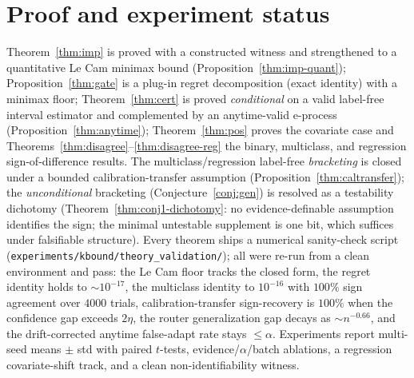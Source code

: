 \documentclass[conference]{IEEEtran}
\theoremstyle{plain}
\theoremstyle{definition}
\begin{document}
\section{Proof and experiment status}\label{app:status}
Theorem~\ref{thm:imp} is proved with a constructed witness and strengthened to a quantitative Le
Cam minimax bound (Proposition~\ref{thm:imp-quant}); Proposition~\ref{thm:gate} is a plug-in regret
decomposition (exact identity) with a minimax floor; Theorem~\ref{thm:cert} is proved
\emph{conditional} on a valid label-free interval estimator and complemented by an anytime-valid
e-process (Proposition~\ref{thm:anytime}); Theorem~\ref{thm:pos} proves the covariate case and
Theorems~\ref{thm:disagree}--\ref{thm:disagree-reg} the binary, multiclass, and regression
sign-of-difference results. The multiclass/regression label-free \emph{bracketing} is closed under
a bounded calibration-transfer assumption (Proposition~\ref{thm:caltransfer}); the \emph{unconditional}
bracketing (Conjecture~\ref{conj:gen}) is resolved as a testability dichotomy
(Theorem~\ref{thm:conj1-dichotomy}: no evidence-definable assumption identifies the
sign; the minimal untestable supplement is one bit, which suffices under falsifiable
structure). Every theorem ships a
numerical sanity-check script (\texttt{experiments/kbound/theory\_validation/}); all were re-run
from a clean environment and pass: the Le Cam floor tracks the closed form, the regret identity
holds to ${\sim}10^{-17}$, the multiclass identity to $10^{-16}$ with $100\%$ sign agreement over
$4000$ trials, calibration-transfer sign-recovery is $100\%$ when the confidence gap exceeds
$2\eta$, the router generalization gap decays as ${\sim}n^{-0.66}$, and the drift-corrected anytime
false-adapt rate stays $\le\alpha$. Experiments report multi-seed means $\pm$ std with paired
$t$-tests, evidence/$\alpha$/batch ablations, a regression covariate-shift track, and a clean
non-identifiability witness.
\end{document}
